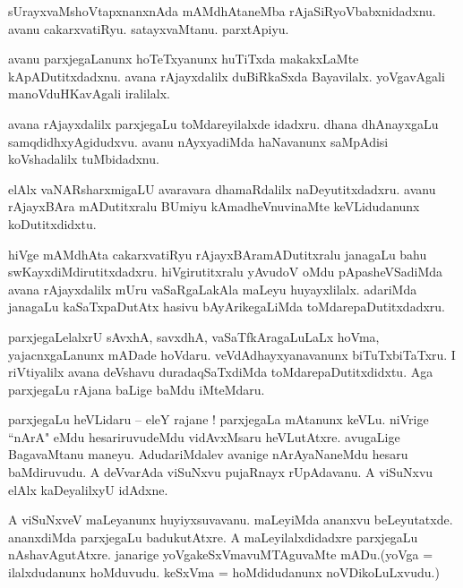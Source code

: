 \documentclass{article}
\begin{document}
\begin{mn}%
sUrayxvaMshoVtapxnanxnAda mAMdhAtaneMba rAjaSiRyoVbabxnidadxnu. avanu cakarxvatiRyu. satayxvaMtanu. 
parxtApiyu.
\end{mn}

\begin{mn}%
avanu parxjegaLanunx hoTeTxyanunx huTiTxda makakxLaMte kApADutitxdadxnu. avana rAjayxdalilx 
duBiRkaSxda Bayavilalx. yoVgavAgali manoVduHKavAgali iralilalx.
\end{mn}

\begin{mn}%
avana rAjayxdalilx parxjegaLu toMdareyilalxde idadxru. dhana dhAnayxgaLu samqdidhxyAgidudxvu. avanu 
nAyxyadiMda haNavanunx saMpAdisi koVshadalilx tuMbidadxnu.
\end{mn}

\begin{mn}%
elAlx vaNARsharxmigaLU avaravara dhamaRdalilx naDeyutitxdadxru. avanu rAjayxBAra mADutitxralu 
BUmiyu kAmadheVnuvinaMte keVLidudanunx koDutitxdidxtu.
\end{mn}

\begin{mn}%
hiVge mAMdhAta cakarxvatiRyu rAjayxBAramADutitxralu janagaLu bahu swKayxdiMdirutitxdadxru. 
hiVgirutitxralu yAvudoV oMdu pApasheVSadiMda avana rAjayxdalilx mUru vaSaRgaLakAla maLeyu 
huyayxlilalx. adariMda janagaLu kaSaTxpaDutAtx hasivu bAyArikegaLiMda toMdarepaDutitxdadxru.
\end{mn}

\begin{mn}%
parxjegaLelalxrU sAvxhA, savxdhA, vaSaTfkAragaLuLaLx hoVma, yajacnxgaLanunx mADade hoVdaru. 
veVdAdhayxyanavanunx biTuTxbiTaTxru. I riVtiyalilx avana deVshavu duradaqSaTxdiMda 
toMdarepaDutitxdidxtu. Aga parxjegaLu rAjana baLige baMdu iMteMdaru.
\end{mn}

\begin{mn}%
parxjegaLu heVLidaru -- eleY rajane ! parxjegaLa mAtanunx keVLu. niVrige ``nArA" eMdu 
hesariruvudeMdu vidAvxMsaru heVLutAtxre. avugaLige BagavaMtanu maneyu. AdudariMdalev avanige 
nArAyaNaneMdu hesaru baMdiruvudu. A deVvarAda viSuNxvu pujaRnayx rUpAdavanu. A viSuNxvu elAlx 
kaDeyalilxyU idAdxne.
\end{mn}

\begin{mn}%
A viSuNxveV maLeyanunx huyiyxsuvavanu. maLeyiMda ananxvu beLeyutatxde. ananxdiMda parxjegaLu 
badukutAtxre. A maLeyilalxdidadxre parxjegaLu nAshavAgutAtxre. janarige yoVgakeSxVmavuMTAguvaMte 
mADu.(yoVga = ilalxdudanunx hoMduvudu. keSxVma = hoMdidudanunx noVDikoLuLxvudu.)
\end{mn}
\end{document}
